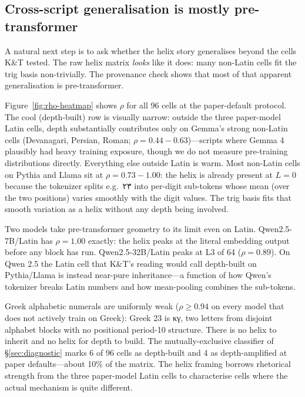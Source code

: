 \documentclass[10pt,letterpaper]{article}
\newcommand{\arabicnum}[1]{{\arabicscriptfont #1}}
\newcommand{\greeknum}[1]{{\greekscriptfont #1}}
\begin{document}
\subsection{Cross-script generalisation is mostly pre-transformer}
\label{sec:results-cross}

A natural next step is to ask whether the helix story generalises
beyond the cells K\&T tested. The raw helix matrix \emph{looks} like
it does: many non-Latin cells fit the trig basis non-trivially. The
provenance check shows that most of that apparent generalisation is
pre-transformer.

Figure~\ref{fig:rho-heatmap} shows $\rho$ for all 96 cells at the
paper-default protocol. The cool (depth-built) row is visually narrow:
outside the three paper-model Latin cells, depth substantially
contributes only on Gemma's strong non-Latin cells (Devanagari,
Persian, Roman; $\rho = 0.44{-}0.63$)---scripts where Gemma 4
plausibly had heavy training exposure, though we do not measure
pre-training distributions directly. Everything else outside Latin
is warm. Most non-Latin cells on Pythia and Llama sit at
$\rho = 0.73{-}1.00$: the helix is already present at $L=0$ because
the tokenizer splits e.g.\ \arabicnum{٢٣} into per-digit sub-tokens
whose mean (over the two positions) varies smoothly with the digit
values. The trig basis fits that smooth variation as a helix without
any depth being involved.

Two models take pre-transformer geometry to its limit even on Latin.
Qwen2.5-7B/Latin has $\rho = 1.00$ exactly: the helix peaks at the
literal embedding output before any block has run. Qwen2.5-32B/Latin
peaks at L3 of 64 ($\rho = 0.89$). On Qwen 2.5 the Latin cell that
K\&T's reading would call depth-built on Pythia/Llama is instead
near-pure inheritance---a function of how Qwen's tokenizer breaks
Latin numbers and how mean-pooling combines the sub-tokens.

Greek alphabetic numerals are uniformly weak ($\rho \ge 0.94$ on
every model that does not actively train on Greek): Greek 23 is
\greeknum{κγ}, two letters from disjoint alphabet blocks with no
positional period-10 structure. There is no helix to inherit and no
helix for depth to build. The mutually-exclusive classifier of
\S\ref{sec:diagnostic} marks 6 of 96 cells as depth-built and 4 as
depth-amplified at paper defaults---about 10\% of the matrix. The
helix framing borrows rhetorical strength from the three paper-model
Latin cells to characterise cells where the actual mechanism is
quite different.
\end{document}
